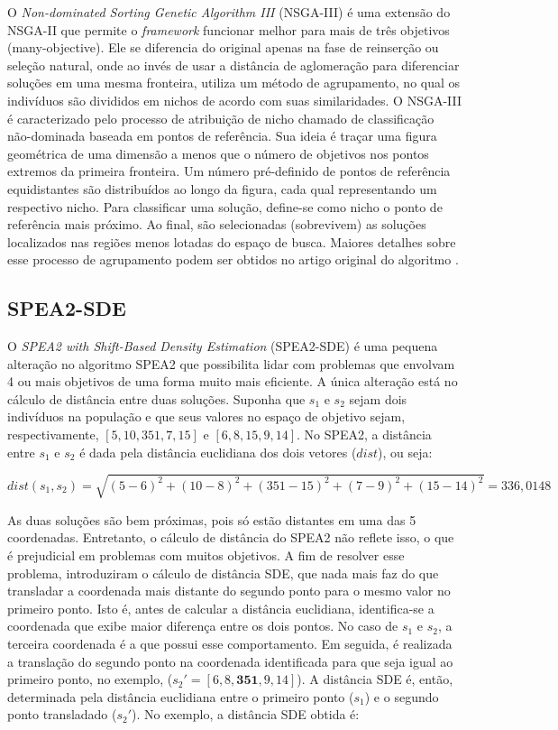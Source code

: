 O \textit{Non-dominated Sorting Genetic Algorithm III} (NSGA-III) \cite{Deb2014} é uma extensão do NSGA-II que permite o \textit{framework} funcionar melhor para mais de três objetivos (many-objective). Ele se diferencia do original apenas na fase de reinserção ou seleção natural, onde ao invés de usar a distância de aglomeração para diferenciar soluções em uma mesma fronteira, utiliza um método de agrupamento, no qual os indivíduos são divididos em nichos de acordo com suas similaridades. O NSGA-III é caracterizado pelo processo de atribuição de nicho chamado de classificação não-dominada baseada em pontos de referência. Sua ideia é traçar uma figura geométrica de uma dimensão a menos que o número de objetivos nos pontos extremos da primeira fronteira. Um número pré-definido de pontos de referência equidistantes são distribuídos ao longo da figura, cada qual representando um respectivo nicho. Para classificar uma solução, define-se como nicho o ponto de referência mais próximo. Ao final, são selecionadas (sobrevivem) as soluções localizados nas regiões menos lotadas do espaço de busca. Maiores detalhes sobre esse processo de agrupamento podem ser obtidos no artigo original do algoritmo \cite{Deb2014}.

\subsection{SPEA2-SDE}

O \textit{SPEA2 with Shift-Based Density Estimation} (SPEA2-SDE) \cite{Spea2SDE} é uma pequena alteração no algoritmo SPEA2 que possibilita lidar com problemas que envolvam 4 ou mais objetivos de uma forma muito mais eficiente. A única alteração está no cálculo de distância entre duas soluções. Suponha que $s_1$ e $s_2$ sejam dois indivíduos na população e que seus valores no espaço de objetivo sejam, respectivamente, $[5, 10, 351, 7, 15]$ e $[6, 8, 15, 9, 14]$. No SPEA2, a distância entre $s_1$ e $s_2$ é dada pela distância euclidiana dos dois vetores ($dist$), ou seja:

\[dist(s_1, s_2) = \sqrt{(5-6)^2 + (10-8)^2 + (351-15)^2 + (7-9)^2 + (15-14)^2} = 336,0148\]

As duas soluções são bem próximas, pois só estão distantes em uma das 5 coordenadas. Entretanto, o cálculo de distância do SPEA2 não reflete isso, o que é prejudicial em problemas com muitos objetivos. A fim de resolver esse problema, \cite{Spea2SDE} introduziram o cálculo de distância \ac{SDE}, que nada mais faz do que transladar a coordenada mais distante do segundo ponto para o mesmo valor no primeiro ponto. Isto é, antes de calcular a distância euclidiana, identifica-se a coordenada que exibe maior diferença entre os dois pontos. No caso de $s_1$ e $s_2$, a terceira coordenada é a que possui esse comportamento. Em seguida, é realizada a translação do segundo ponto na coordenada identificada para que seja igual ao primeiro ponto, no exemplo, ($s_2' = [6, 8, \textbf{351}, 9, 14]$). A distância SDE é, então, determinada pela distância euclidiana entre o primeiro ponto ($s_1$) e o segundo ponto transladado ($s_2'$). No exemplo, a distância SDE obtida é: 

